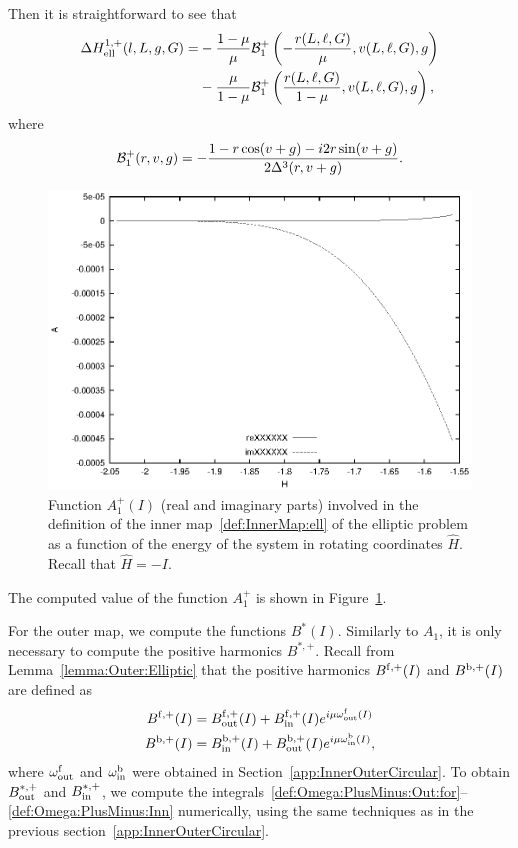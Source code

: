 Then it is straightforward to see that 
\begin{equation}
  \begin{split}
\Delta H_{\mathrm{ell}}^{1,+}(l,L,g,G)
=& 
-\frac{1-\mu}{\mu}\mathcal{B}_1^+\left(-\frac{r(L,\ell,G)}{\mu},v(L,\ell,G),g\right)
\\
      &-\frac{\mu}{1-\mu}\mathcal{B}_1^+\left(\frac{r(L,\ell,G)}{1-\mu},v(L,\ell,G),g\right),
  \end{split}
\end{equation}
where
\[ \mathcal{B}_1^+(r,v,g) =
-\frac{1-r\cos(v+g)-i2r\sin(v+g)}{2\Delta^3(r,v+g)}. \]

\begin{figure}
\includegraphics{figs/inner_ell}
\caption{Function $A_1^+(I)$ (real and imaginary parts) involved in
the definition of the inner map~\eqref{def:InnerMap:ell} of the
elliptic problem as a function of the energy of the system in rotating
coordinates $\hat H$. Recall that $\hat H = -I$.}
\label{fig:inner_ell}
\end{figure}

The computed value of the function $A_1^+$ is shown in
Figure~\ref{fig:inner_ell}.

For the outer map, we compute the functions $B^*(I)$.
Similarly to $A_1$, it is only necessary to compute the positive
harmonics $B^{*,+}$.
Recall from Lemma~\ref{lemma:Outer:Elliptic} that the positive
harmonics $B^{\mathrm{f},+}(I)$ and $B^{\mathrm{b},+}(I)$ are defined as 
\begin{equation}\label{def:Omega:PlusMinus:Numerics}
\begin{split}
B^{\mathrm{f},+}(I)&=B_{\mathrm{out}}^{\mathrm{f},+}(I)+B_{\mathrm{in}}^{\mathrm{f},+}(I)e^{i\mu\omega_{\mathrm{out}}^{\mathrm{f}}(I)}\\
B^{\mathrm{b},+}(I)&=B_{\mathrm{in}}^{\mathrm{b},+}(I)+B_{\mathrm{out}}^{\mathrm{b},+}(I)e^{i\mu\omega_{\mathrm{in}}^{\mathrm{b}}(I)},
\end{split}
\end{equation}
where $\omega_{\mathrm{out}}^{\mathrm{f}}$ and $\omega_{\mathrm{in}}^{\mathrm{b}}$ were obtained in
Section~\ref{app:InnerOuterCircular}.
To obtain $B_{\mathrm{out}}^{*,+}$ and $B_{\mathrm{in}}^{*,+}$, we compute the
integrals~\eqref{def:Omega:PlusMinus:Out:for}--\eqref{def:Omega:PlusMinus:Inn}
numerically, using the same techniques as in the previous
section~\ref{app:InnerOuterCircular}.

